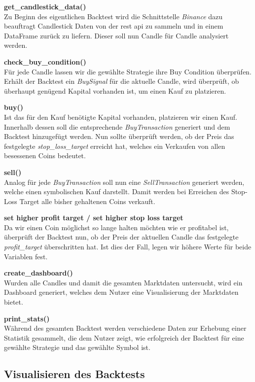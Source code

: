 \documentclass[oneside]{ausarbeitung}
\begin{document}
\textbf{get\_candlestick\_data()} \\
Zu Beginn des eigentlichen Backtest wird die Schnittstelle \textit{Binance} dazu beauftragt Candlestick Daten von der \ac{rest} \ac{api} zu sammeln und in einem DataFrame zurück zu liefern. Dieser soll nun Candle für Candle analysiert werden.

\textbf{check\_buy\_condition()} \\
Für jede Candle lassen wir die gewählte Strategie ihre Buy Condition überprüfen. Erhält der Backtest ein \textit{BuySignal} für die aktuelle Candle, wird überprüft, ob überhaupt genügend Kapital vorhanden ist, um einen Kauf zu platzieren.

\textbf{buy()} \\
Ist das für den Kauf benötigte Kapital vorhanden, platzieren wir einen Kauf. Innerhalb dessen soll die entsprechende \textit{BuyTransaction} generiert und dem Backtest hinzugefügt werden. Nun sollte überprüft werden, ob der Preis das festgelegte \textit{stop\_loss\_target} erreicht hat, welches ein Verkaufen von allen besessenen Coins bedeutet.

\textbf{sell()} \\
Analog für jede \textit{BuyTransaction} soll nun eine \textit{SellTransaction} generiert werden, welche einen symbolischen Kauf darstellt. Damit werden bei Erreichen des Stop-Loss Target alle bisher gehaltenen Coins verkauft.

\textbf{set higher profit target / set higher stop loss target} \\
Da wir einen Coin möglichst so lange halten möchten wie er profitabel ist, überprüft der Backtest nun, ob der Preis der aktuellen Candle das festgelegte \textit{profit\_target} überschritten hat. Ist dies der Fall, legen wir höhere Werte für beide Variablen fest.

\textbf{create\_dashboard()} \\
Wurden alle Candles und damit die gesamten Marktdaten untersucht, wird ein Dashboard generiert, welches dem Nutzer eine Visualisierung der Marktdaten bietet. 

\textbf{print\_stats()} \\
Während des gesamten Backtest werden verschiedene Daten zur Erhebung einer Statistik gesammelt, die dem Nutzer zeigt, wie erfolgreich der Backtest für eine gewählte Strategie und das gewählte Symbol ist.

\subsection{Visualisieren des Backtests}
\label{sub:visualisieren_des_backtests}
\end{document}
